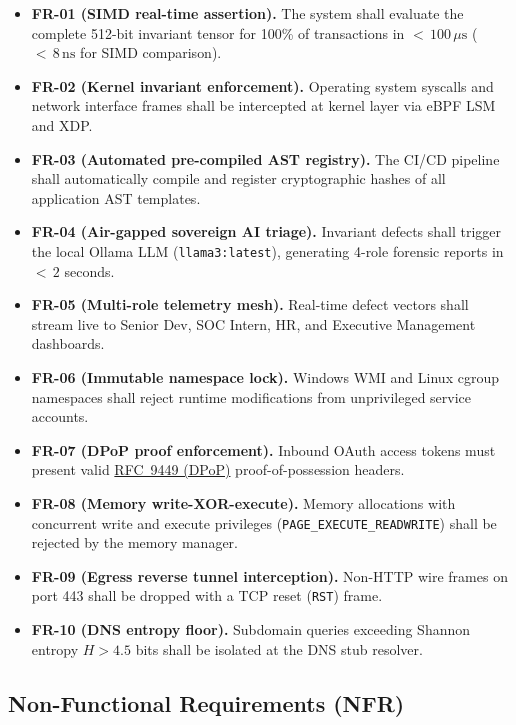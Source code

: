 \documentclass{portalciencia}
\newcommand{\linkrfcdpop}{%
  \href{https://www.rfc-editor.org/rfc/rfc9449}{RFC~9449 (DPoP)}%
}
\theoremstyle{plain}
\theoremstyle{definition}
\begin{document}
\begin{itemize}
  \item \textbf{FR-01 (SIMD real-time assertion).} The system shall evaluate the complete 512-bit invariant tensor for 100\% of transactions in ${<}\,100\,\mu\mathrm{s}$ (${<}\,8\,\mathrm{ns}$ for SIMD comparison).
  \item \textbf{FR-02 (Kernel invariant enforcement).} Operating system syscalls and network interface frames shall be intercepted at kernel layer via eBPF LSM and XDP.
  \item \textbf{FR-03 (Automated pre-compiled AST registry).} The CI/CD pipeline shall automatically compile and register cryptographic hashes of all application AST templates.
  \item \textbf{FR-04 (Air-gapped sovereign AI triage).} Invariant defects shall trigger the local Ollama LLM (\texttt{llama3:latest}), generating 4-role forensic reports in ${<}\,2$ seconds.
  \item \textbf{FR-05 (Multi-role telemetry mesh).} Real-time defect vectors shall stream live to Senior Dev, SOC Intern, HR, and Executive Management dashboards.
  \item \textbf{FR-06 (Immutable namespace lock).} Windows WMI and Linux cgroup namespaces shall reject runtime modifications from unprivileged service accounts.
  \item \textbf{FR-07 (DPoP proof enforcement).} Inbound OAuth access tokens must present valid \linkrfcdpop{} proof-of-possession headers.
  \item \textbf{FR-08 (Memory write-XOR-execute).} Memory allocations with concurrent write and execute privileges (\texttt{PAGE\_EXECUTE\_READWRITE}) shall be rejected by the memory manager.
  \item \textbf{FR-09 (Egress reverse tunnel interception).} Non-HTTP wire frames on port 443 shall be dropped with a TCP reset (\texttt{RST}) frame.
  \item \textbf{FR-10 (DNS entropy floor).} Subdomain queries exceeding Shannon entropy $H > 4.5$ bits shall be isolated at the DNS stub resolver.
\end{itemize}

\subsection{Non-Functional Requirements (NFR)}
\end{document}
